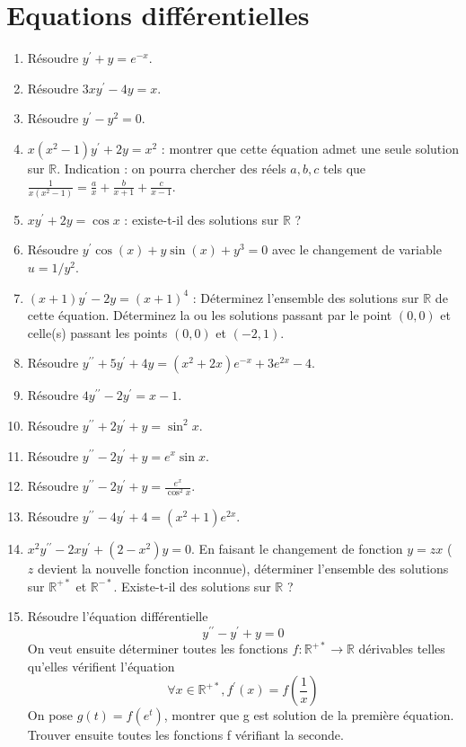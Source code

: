 \chapter{Equations différentielles}
\begin{enumerate}
\item Résoudre $y^{\prime}+y=e^{-x}$.
\item Résoudre $3 x y^{\prime}-4 y=x$.
\item Résoudre $y^{\prime}-y^2=0$.
\item $x\left(x^2-1\right) y^{\prime}+2 y=x^2$ : montrer que cette équation admet une seule solution sur $\mathbb{R}$. Indication : on pourra chercher des réels $a, b, c$ tels que $\frac{1}{x\left(x^2-1\right)}=\frac{a}{x}+\frac{b}{x+1}+\frac{c}{x-1}$.
\item $x y^{\prime}+2 y=\cos x$ : existe-t-il des solutions sur $\mathbb{R}$ ?
\item Résoudre $y^{\prime} \cos (x)+y \sin (x)+y^3=0$ avec le changement de variable $u=1 / y^2$.
\item $(x+1) y^{\prime}-2 y=(x+1)^4$ : Déterminez l'ensemble des solutions sur $\mathbb{R}$ de cette équation. Déterminez la ou les solutions passant par le point $(0,0)$ et celle(s) passant les points $(0,0)$ et $(-2,1)$.
\item Résoudre $y^{\prime \prime}+5 y^{\prime}+4 y=\left(x^2+2 x\right) e^{-x}+3 e^{2 x}-4$.
\item Résoudre $4 y^{\prime \prime}-2 y^{\prime}=x-1$.
\item Résoudre $y^{\prime \prime}+2 y^{\prime}+y=\sin ^2 x$.
\item Résoudre $y^{\prime \prime}-2 y^{\prime}+y=e^x \sin x$.
\item Résoudre $y^{\prime \prime}-2 y^{\prime}+y=\frac{e^x}{\cos ^2 x}$.
\item Résoudre $y^{\prime \prime}-4 y^{\prime}+4=\left(x^2+1\right) e^{2 x}$.
\item $x^2 y^{\prime \prime}-2 x y^{\prime}+\left(2-x^2\right) y=0$. En faisant le changement de fonction $y=z x$ ( $z$ devient la nouvelle fonction inconnue), déterminer l'ensemble des solutions sur $\mathbb{R}^{+*}$ et $\mathbb{R}^{-*}$. Existe-t-il des solutions sur $\mathbb{R}$ ?
\item Résoudre l'équation différentielle
$$
y^{\prime \prime}-y^{\prime}+y=0
$$
On veut ensuite déterminer toutes les fonctions $f: \mathbb{R}^{+*} \rightarrow \mathbb{R}$ dérivables telles qu'elles vérifient l'équation
$$
\forall x \in \mathbb{R}^{+*}, f^{\prime}(x)=f\left(\frac{1}{x}\right)
$$
On pose $g(t)=f\left(e^t\right)$, montrer que g est solution de la première équation. Trouver ensuite toutes les fonctions f vérifiant la seconde.
\end{enumerate}
